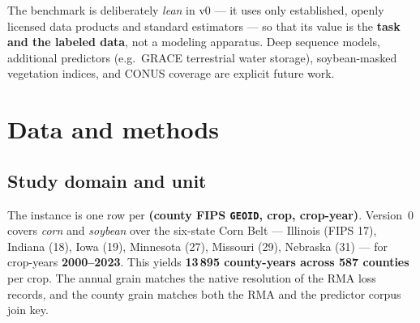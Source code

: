 \documentclass[essd, manuscript]{copernicus}
\begin{document}
The benchmark is deliberately \emph{lean} in v0 --- it uses only established, openly licensed data products and standard estimators --- so that its value is the \textbf{task and the labeled data}, not a modeling apparatus. Deep sequence models, additional predictors (e.g.\ GRACE terrestrial water storage), soybean-masked vegetation indices, and CONUS coverage are explicit future work.

\section{Data and methods}
\label{sec:methods}

\subsection{Study domain and unit}
The instance is one row per \textbf{(county FIPS \texttt{GEOID}, crop, crop-year)}. Version~0 covers \emph{corn} and \emph{soybean} over the six-state Corn Belt --- Illinois (FIPS 17), Indiana (18), Iowa (19), Minnesota (27), Missouri (29), Nebraska (31) --- for crop-years \textbf{2000--2023}. This yields \textbf{13\,895 county-years across 587 counties} per crop. The annual grain matches the native resolution of the RMA loss records, and the county grain matches both the RMA and the predictor corpus join key.
\end{document}
